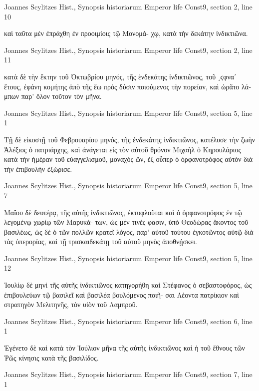 \documentclass[12pt,letterpaper,twoside,final]{memoir}
\begin{document}
\begin{greek}
Joannes Scylitzes Hist., Synopsis historiarum 
Emperor life Const9, section 2, line 10

                            καὶ ταῦτα μὲν ἐπράχθη ἐν προοιμίοις τῷ Μονομά-  
χῳ, κατὰ τὴν δεκάτην ἰνδικτιῶνα. 



Joannes Scylitzes Hist., Synopsis historiarum 
Emperor life Const9, section 2, line 11

                                       κατὰ δὲ τὴν ἕκτην τοῦ Ὀκτωβρίου 
μηνός, τῆς ἑνδεκάτης ἰνδικτιῶνος, τοῦ ͵ϛφναʹ ἔτους, ἐφάνη κομήτης ἀπὸ 
τῆς ἕω πρὸς δύσιν ποιούμενος τὴν πορείαν, καὶ ὡρᾶτο λάμπων παρ' 
ὅλον τοῦτον τὸν μῆνα. 



Joannes Scylitzes Hist., Synopsis historiarum 
Emperor life Const9, section 5, line 1

Τῇ δὲ εἰκοστῇ τοῦ Φεβρουαρίου μηνός, τῆς ἑνδεκάτης ἰνδικτιῶνος, 
κατέλυσε τὴν ζωὴν Ἀλέξιος ὁ πατριάρχης, καὶ ἀνάγεται εἰς τὸν αὐτοῦ 
θρόνον Μιχαὴλ ὁ Κηρουλάριος κατὰ τὴν ἡμέραν τοῦ εὐαγγελισμοῦ, 
μοναχὸς ὤν, ἐξ οὗπερ ὁ ὀρφανοτρόφος αὐτὸν διὰ τὴν ἐπιβουλὴν ἐξώρισε. 



Joannes Scylitzes Hist., Synopsis historiarum 
Emperor life Const9, section 5, line 7

                                  Μαΐου δὲ δευτέρᾳ, τῆς αὐτῆς ἰνδικτιῶνος, 
ἐκτυφλοῦται καὶ ὁ ὀρφανοτρόφος ἐν τῷ λεγομένῳ χωρίῳ τῶν Μαρυκά-
των, ὡς μέν τινές φασιν, ὑπὸ Θεοδώρας ἄκοντος τοῦ βασιλέως, ὡς δὲ ὁ 
τῶν πολλῶν κρατεῖ λόγος, παρ' αὐτοῦ τούτου ἐγκοτῶντος αὐτῷ διὰ 
τὰς ὑπερορίας, καὶ τῇ τρισκαιδεκάτῃ τοῦ αὐτοῦ μηνὸς ἀποθνῄσκει. 



Joannes Scylitzes Hist., Synopsis historiarum 
Emperor life Const9, section 5, line 12

Ἰουλίῳ δὲ μηνὶ τῆς αὐτῆς ἰνδικτιῶνος κατηγορήθη καὶ Στέφανος ὁ 
σεβαστοφόρος, ὡς ἐπιβουλεύων τῷ βασιλεῖ καὶ βασιλέα βουλόμενος ποιῆ-  
σαι Λέοντα πατρίκιον καὶ στρατηγὸν Μελιτηνῆς, τὸν υἱὸν τοῦ Λαμπροῦ. 



Joannes Scylitzes Hist., Synopsis historiarum 
Emperor life Const9, section 6, line 1

Ἐγένετο δὲ καὶ κατὰ τὸν Ἰούλιον μῆνα τῆς αὐτῆς ἰνδικτιῶνος καὶ 
ἡ τοῦ ἔθνους τῶν Ῥῶς κίνησις κατὰ τῆς βασιλίδος. 



Joannes Scylitzes Hist., Synopsis historiarum 
Emperor life Const9, section 7, line 1


\end{greek}
\end{document}

